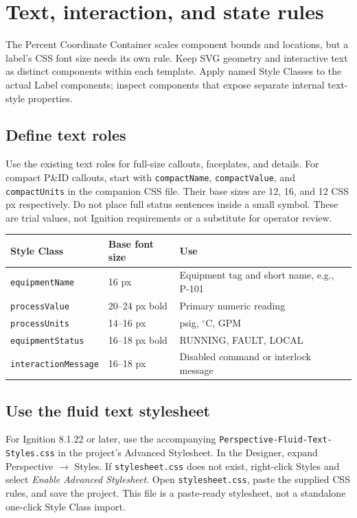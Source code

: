 \section{Text, interaction, and state rules}
The Percent Coordinate Container scales component bounds and locations, but a label's CSS font size needs its own rule. Keep SVG geometry and interactive text as distinct components within each template. Apply named Style Classes to the actual Label components; inspect components that expose separate internal text-style properties.

\subsection{Define text roles}
Use the existing text roles for full-size callouts, faceplates, and details. For compact P\&ID callouts, start with \texttt{compactName}, \texttt{compactValue}, and \texttt{compactUnits} in the companion CSS file. Their base sizes are 12, 16, and 12 CSS px respectively. Do not place full status sentences inside a small symbol. These are trial values, not Ignition requirements or a substitute for operator review.

\begin{center}
\begin{tabular}{@{}p{4.91cm}p{3.62cm}p{7.11cm}@{}}
\toprule
Style Class & Base font size & Use\\ \midrule
\texttt{equipmentName} & 16 px & Equipment tag and short name, e.g., P-101\\
\texttt{processValue} & 20--24 px bold & Primary numeric reading\\
\texttt{processUnits} & 14--16 px & psig, $^\circ$C, GPM\\
\texttt{equipmentStatus} & 16--18 px bold & RUNNING, FAULT, LOCAL\\
\texttt{interactionMessage} & 16--18 px & Disabled command or interlock message\\
\bottomrule
\end{tabular}
\end{center}

\subsection{Use the fluid text stylesheet}
For Ignition 8.1.22 or later, use the accompanying \texttt{Perspective-Fluid-Text-Styles.css} in the project's Advanced Stylesheet. In the Designer, expand Perspective \(\rightarrow\) Styles. If \texttt{stylesheet.css} does not exist, right-click Styles and select \emph{Enable Advanced Stylesheet}. Open \texttt{stylesheet.css}, paste the supplied CSS rules, and save the project. This file is a paste-ready stylesheet, not a standalone one-click Style Class import.

